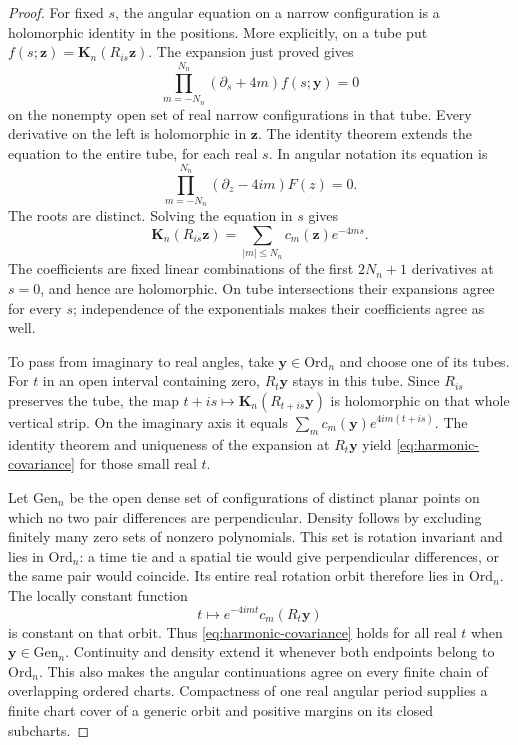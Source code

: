 \documentclass[11pt,letterpaper,reqno]{amsart}
\theoremstyle{definition}
\theoremstyle{remark}
\begin{document}
\begin{proof}
For fixed $s$, the angular equation on a narrow configuration is a
holomorphic identity in the positions. More explicitly, on a tube
put $f(s;\mathbf z)=\mathbf K_n(R_{is}\mathbf z)$. The expansion
just proved gives
\[
 \prod_{m=-N_n}^{N_n}(\partial_s+4m)f(s;\mathbf y)=0
\]
on the nonempty open set of real narrow configurations in that tube.
Every derivative on the left is holomorphic in $\mathbf z$.
The identity theorem extends the equation to the entire tube, for
each real $s$. In angular notation its equation is
\begin{equation}\label{eq:outline-angular-ode}
 \prod_{m=-N_n}^{N_n}(\partial_z-4im)F(z)=0.
\end{equation}
The roots are distinct. Solving the equation in $s$ gives
\[
 \mathbf K_n(R_{is}\mathbf z)
       =\sum_{|m|\le N_n}c_m(\mathbf z)e^{-4ms}.
\]
The coefficients are fixed linear combinations of the first
$2N_n+1$ derivatives at $s=0$, and hence are holomorphic. On tube
intersections their expansions agree for every $s$; independence of
the exponentials makes their coefficients agree as well.

To pass from imaginary to real angles, take $\mathbf y\in
\mathrm{Ord}_n$ and choose one of its tubes. For $t$ in an open
interval containing zero, $R_t\mathbf y$ stays in this tube. Since
$R_{is}$ preserves the tube, the map
$t+is\mapsto\mathbf K_n(R_{t+is}\mathbf y)$ is holomorphic on
that whole vertical strip. On the imaginary axis it equals
$\sum_m c_m(\mathbf y)e^{4im(t+is)}$. The identity theorem and
uniqueness of the expansion at $R_t\mathbf y$ yield
\eqref{eq:harmonic-covariance} for those small real $t$.

Let $\mathrm{Gen}_n$ be the open dense set of configurations of
distinct planar points on which no two pair differences are
perpendicular. Density follows by excluding
finitely many zero sets of nonzero polynomials. This set is rotation
invariant and lies in $\mathrm{Ord}_n$: a time tie and a spatial
tie would give perpendicular differences, or the same pair would
coincide. Its entire real rotation orbit therefore lies in
$\mathrm{Ord}_n$. The locally constant function
\[
 t\longmapsto e^{-4imt}c_m(R_t\mathbf y)
\]
is constant on that orbit. Thus \eqref{eq:harmonic-covariance}
holds for all real $t$ when $\mathbf y\in\mathrm{Gen}_n$.
Continuity and density extend it whenever both endpoints belong to
$\mathrm{Ord}_n$. This also makes the angular continuations agree
on every finite chain of overlapping ordered charts. Compactness of
one real angular period supplies a finite chart cover of a generic
orbit and positive margins on its closed subcharts.


\end{proof}
\end{document}
